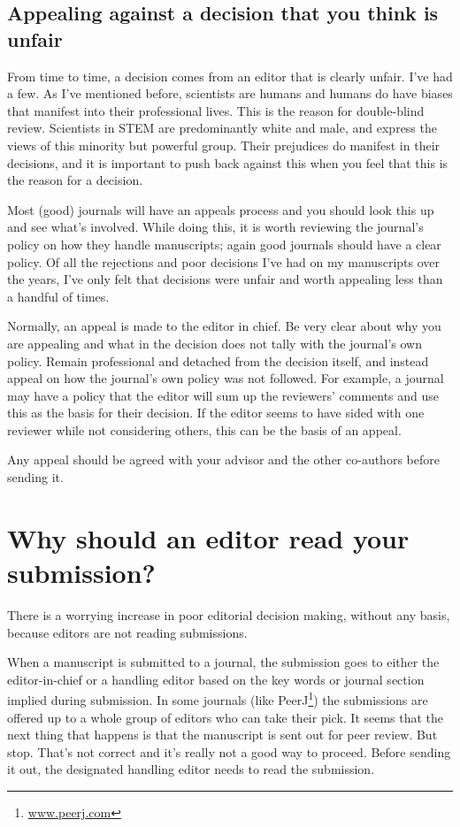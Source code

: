 \documentclass[
]{krantz}
\renewcommand{\href}[2]{#2\footnote{\url{#1}}}
\begin{document}
\hypertarget{appealing-against-a-decision-that-you-think-is-unfair}{%
\section{Appealing against a decision that you think is unfair}\label{appealing-against-a-decision-that-you-think-is-unfair}}

From time to time, a decision comes from an editor that is clearly unfair. I've had a few. As I've mentioned before, scientists are humans and humans do have biases that manifest into their professional lives. This is the reason for double-blind review. Scientists in STEM are predominantly white and male, and express the views of this minority but powerful group. Their prejudices do manifest in their decisions, and it is important to push back against this when you feel that this is the reason for a decision.

Most (good) journals will have an appeals process and you should look this up and see what's involved. While doing this, it is worth reviewing the journal's policy on how they handle manuscripts; again good journals should have a clear policy. Of all the rejections and poor decisions I've had on my manuscripts over the years, I've only felt that decisions were unfair and worth appealing less than a handful of times.

Normally, an appeal is made to the editor in chief. Be very clear about why you are appealing and what in the decision does not tally with the journal's own policy. Remain professional and detached from the decision itself, and instead appeal on how the journal's own policy was not followed. For example, a journal may have a policy that the editor will sum up the reviewers' comments and use this as the basis for their decision. If the editor seems to have sided with one reviewer while not considering others, this can be the basis of an appeal.

Any appeal should be agreed with your advisor and the other co-authors before sending it.

\hypertarget{editors}{%
\chapter{Why should an editor read your submission?}\label{editors}}

There is a worrying increase in poor editorial decision making, without any basis, because editors are not reading submissions.

When a manuscript is submitted to a journal, the submission goes to either the editor-in-chief or a handling editor based on the key words or journal section implied during submission. In some journals (like \href{www.peerj.com}{PeerJ}) the submissions are offered up to a whole group of editors who can take their pick. It seems that the next thing that happens is that the manuscript is sent out for peer review. But stop. That's not correct and it's really not a good way to proceed. Before sending it out, the designated handling editor needs to read the submission.
\end{document}
